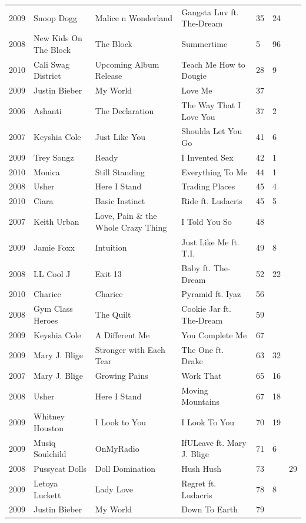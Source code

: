\documentclass{article}
\begin{document}
\begin{tabular}{lllllll}
2009 & Snoop Dogg & Malice n Wonderland & Gangsta Luv ft. The-Dream & 35 & 24 &  \\
2008 & New Kids On The Block & The Block & Summertime & 5 & 96 &  \\
2010 & Cali Swag District & Upcoming Album Release & Teach Me How to Dougie & 28 & 9 &  \\
2009 & Justin Bieber & My World & Love Me & 37 &  &  \\
2006 & Ashanti & The Declaration & The Way That I Love You & 37 & 2 &  \\
2007 & Keyshia Cole & Just Like You & Shoulda Let You Go & 41 & 6 &  \\
2009 & Trey Songz & Ready & I Invented Sex & 42 & 1 &  \\
2010 & Monica & Still Standing & Everything To Me & 44 & 1 &  \\
2008 & Usher & Here I Stand & Trading Places & 45 & 4 &  \\
2010 & Ciara & Basic Instinct & Ride ft. Ludacris & 45 & 5 &  \\
2007 & Keith Urban & Love, Pain \& the Whole Crazy Thing & I Told You So & 48 &  &  \\
2009 & Jamie Foxx & Intuition & Just Like Me ft. T.I. & 49 & 8 &  \\
2008 & LL Cool J & Exit 13 & Baby ft. The-Dream & 52 & 22 &  \\
2010 & Charice & Charice & Pyramid ft. Iyaz & 56 &  &  \\
2008 & Gym Class Heroes & The Quilt & Cookie Jar ft. The-Dream & 59 &  &  \\
2009 & Keyshia Cole & A Different Me & You Complete Me & 67 &  &  \\
2009 & Mary J. Blige & Stronger with Each Tear & The One ft. Drake & 63 & 32 &  \\
2007 & Mary J. Blige & Growing Pains & Work That & 65 & 16 &  \\
2008 & Usher & Here I Stand & Moving Mountains & 67 & 18 &  \\
2009 & Whitney Houston & I Look to You & I Look To You & 70 & 19 &  \\
2009 & Musiq Soulchild & OnMyRadio & IfULeave ft. Mary J. Blige & 71 & 6 &  \\
2008 & Pussycat Dolls & Doll Domination & Hush Hush & 73 &  & 29 \\
2009 & Letoya Luckett & Lady Love & Regret ft. Ludacris & 78 & 8 &  \\
2009 & Justin Bieber & My World & Down To Earth & 79 &  &  \\

\end{tabular}
\end{document}
